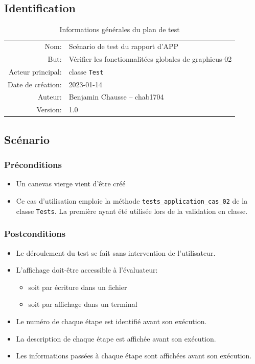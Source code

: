 \documentclass[a11paper, 11pt]{article}
\begin{document}
\subsection{Identification}
\begin{table}[H] %
\centering\caption{Informations générales du plan de test}\label{fig:planTest}
\begin{tabular}{rl}
  \\ \toprule
  Nom:               & Scénario de test du rapport d'APP \\
  But:               & Vérifier les fonctionnalitées globales de graphicus-02\\
  Acteur principal:  & classe \verb|Test| \\
  Date de création:  & 2023-01-14 \\
  Auteur:            & Benjamin Chausse -- chab1704 \\
  Version:           & 1.0 \\
  \bottomrule
\end{tabular}
\end{table}%

\subsection{Scénario}

\subsubsection{Préconditions}

\begin{itemize}
  \item Un canevas vierge vient d'être créé
  \item Ce cas d'utilisation emploie la méthode \verb|tests_application_cas_02|
    de la classe \verb|Tests|. La première ayant été utilisée lors de la
    validation en classe.
\end{itemize}


\subsubsection{Postconditions}

\begin{itemize}
  \item Le déroulement du test se fait sans intervention de l'utilisateur.
  \item L'affichage doit-être accessible à l'évaluateur:
      \begin{itemize}
        \item soit par écriture dans un fichier
        \item soit par affichage dans un terminal
      \end{itemize}
  \item Le numéro de chaque étape est identifié avant son exécution.
  \item La description de chaque étape est affichée avant son exécution.
  \item Les informations passées à chaque étape sont affichées avant son exécution.
\end{itemize}
\end{document}
